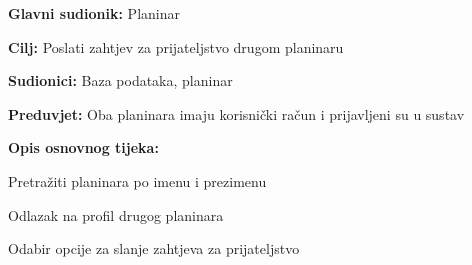 		\noindent {}
		\begin{packed_item}
			
			\item \textbf{Glavni sudionik: }$ $Planinar$ $
			\item  \textbf{Cilj:} $ $Poslati zahtjev za prijateljstvo drugom planinaru $ $
			\item  \textbf{Sudionici:} $ $Baza podataka, planinar$ $
			\item  \textbf{Preduvjet:} $ $Oba planinara imaju korisnički račun i prijavljeni su u sustav $ $
			\item  \textbf{Opis osnovnog tijeka:}
			
			\item[] \begin{packed_enum}
				
				\item $ $Pretražiti planinara po imenu i prezimenu$ $
				\item $ $Odlazak na profil drugog planinara$ $
				\item $ $Odabir opcije za slanje zahtjeva za prijateljstvo $ $
				
			\end{packed_enum}
		\end{packed_item}
	
